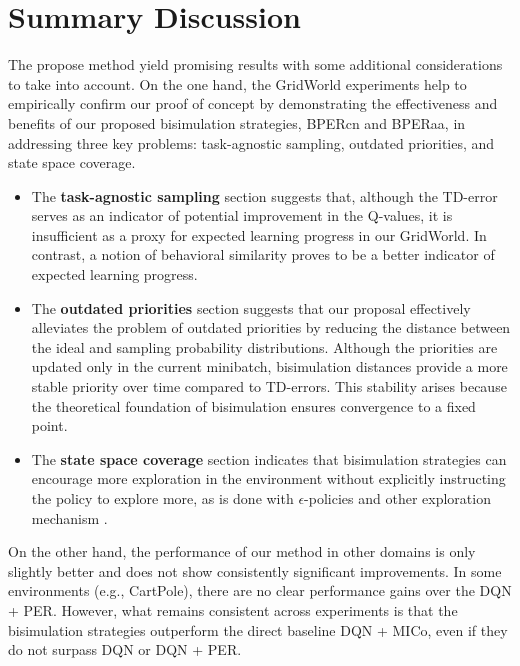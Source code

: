 \section{Summary Discussion}
\label{sec:summary_discussion}

The propose method yield promising results with some additional considerations to take into account. On the one hand, the GridWorld experiments help to empirically confirm our proof of concept by demonstrating the effectiveness and benefits of our proposed bisimulation strategies, BPERcn and BPERaa, in addressing three key problems: task-agnostic sampling, outdated priorities, and state space coverage.

\begin{itemize}
    \item The \textbf{task-agnostic sampling} section suggests that, although the TD-error serves as an indicator of potential improvement in the Q-values, it is insufficient as a proxy for expected learning progress in our GridWorld. In contrast, a notion of behavioral similarity proves to be a better indicator of expected learning progress.
    \item The \textbf{outdated priorities} section suggests that our proposal effectively alleviates the problem of outdated priorities by reducing the distance between the ideal and sampling probability distributions. Although the priorities are updated only in the current minibatch, bisimulation distances provide a more stable priority over time compared to TD-errors. This stability arises because the theoretical foundation of bisimulation ensures convergence to a fixed point.
    \item The \textbf{state space coverage} section indicates that bisimulation strategies can encourage more exploration in the environment without explicitly instructing the policy to explore more, as is done with $\epsilon$-policies and other exploration mechanism \cite{amin2021survey,ladosz2022exploration}.    
\end{itemize}

On the other hand, the performance of our method in other domains is only slightly better and does not show consistently significant improvements. In some environments (e.g., CartPole), there are no clear performance gains over the DQN + PER. However, what remains consistent across experiments is that the bisimulation strategies outperform the direct baseline DQN + MICo, even if they do not surpass DQN or DQN + PER.

